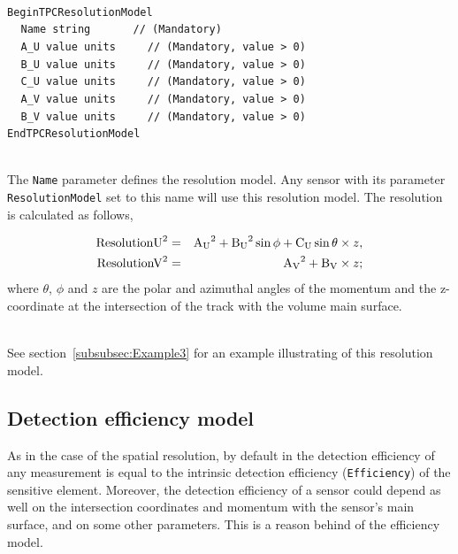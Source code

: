 ~\\
\noindent
{\tt BeginTPCResolutionModel} \\
$~~~~~${\tt Name        string                    $~~~~~~~~~~~$    // (Mandatory)} \\
$~~~~~${\tt A\_U         value units                  $~~~~~~~$    // (Mandatory, value > 0)} \\
$~~~~~${\tt B\_U         value units                  $~~~~~~~$    // (Mandatory, value > 0)} \\
$~~~~~${\tt C\_U         value units                  $~~~~~~~$    // (Mandatory, value > 0)} \\
$~~~~~${\tt A\_V         value units                  $~~~~~~~$    // (Mandatory, value > 0)} \\
$~~~~~${\tt B\_V         value units                  $~~~~~~~$    // (Mandatory, value > 0)} \\
{\tt EndTPCResolutionModel}

~\\
The {\tt Name} parameter defines the resolution model. Any sensor with its parameter {\tt ResolutionModel} set 
to this name will use this resolution model. The resolution is calculated as follows,

\begin{eqnarray}
  {\rm ResolutionU}^2 &=& {\rm A_U}^2 + {\rm B_U}^2\sin\phi + {\rm C_U}\sin\theta\times z, \\
  {\rm ResolutionV}^2 &=& {\rm A_V}^2 + {\rm B_V}\times z;
\end{eqnarray}
\noindent
where $\theta$, $\phi$ and $z$ are the polar and azimuthal angles of the momentum and the z-coordinate at the intersection of the track with 
the volume main surface.

~\\
\noindent
See section~\ref{subsubsec:Example3} for an example illustrating of this resolution model.

\subsection{Detection efficiency model}

As in the case of the spatial resolution, by default in {\guari} the detection efficiency of any measurement is equal to the intrinsic detection efficiency ({\tt Efficiency}) 
of the sensitive element. Moreover, the detection efficiency of a sensor could depend as well on the intersection coordinates and momentum with the sensor's main surface, and 
on some other parameters. This is a reason behind of the efficiency model.

